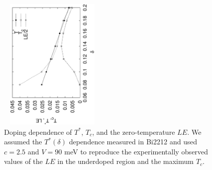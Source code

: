 \documentclass[twoside]{article}
\begin{document}
\begin{figure}
\begin{center}
\includegraphics[width=12pc,height=15pc,angle=-90]{Figtc.ps}
\caption{Doping dependence of $T^*$, $T_c$, and the zero-temperature
$LE$. We assumed the $T^*(\delta)$ dependence
measured in Bi2212 \cite{ding} and used $c=2.5$ and $V=90$ meV to reproduce
the experimentally observed values of the $LE$ in the underdoped region
and the maximum $T_c$.}
\label{tctstar}
\end{center}
\end{figure}
\end{document}
